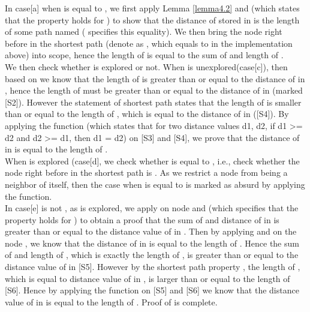 In case[a] when  is equal to , we first apply Lemma \ref{lemma4.2}  and (which states that the  property holds for ) to show that the distance of  stored in  is the length of some  path named  ( specifies this equality). We then bring the node  right before  in the shortest  path (denote as , which equals to  in the implementation above) into scope, hence the length of  is equal to the sum of  and length of . 
\\

We then check whether  is explored or not. When  is unexplored(case[c]), then based on  we know that the length of  is greater than or equal to the distance of  in , hence the length of  must be greater than or equal to the distance of  in (marked [S2]). However the statement of shortest path  states that the length of  is smaller than or equal to the length of , which is equal to the distance of  in ([S4]). By applying the function (which states that for two distance values d1, d2, if d1 >= d2 and d2 >= d1, then d1 = d2) on [S3] and [S4], we prove that the distance of  in  is equal to the length of .
\\

When  is explored (case[d], we check whether  is equal to , i.e., check whether the node right before  in the shortest path  is . As we restrict a node from being a neighbor of itself, then the case when  is equal to  is marked as absurd by applying the  function. 
\\

In case[e]  is not , as  is explored, we apply  on node  and  (which specifies that the  property holds for ) to obtain a proof that the sum of  and distance of  in  is greater than or equal to the distance value of  in . Then by applying  and  on the node , we know that the distance of  in  is equal to the length of . Hence the sum of  and length of , which is exactly the length of , is greater than or equal to the distance value of  in [S5]. However by the shortest path property , the length of , which is equal to distance value of  in , is larger than or equal to the length of  [S6]. Hence by applying the function  on [S5] and [S6] we know that the distance value of  in  is equal to the length of . Proof of  is complete. 
\\

